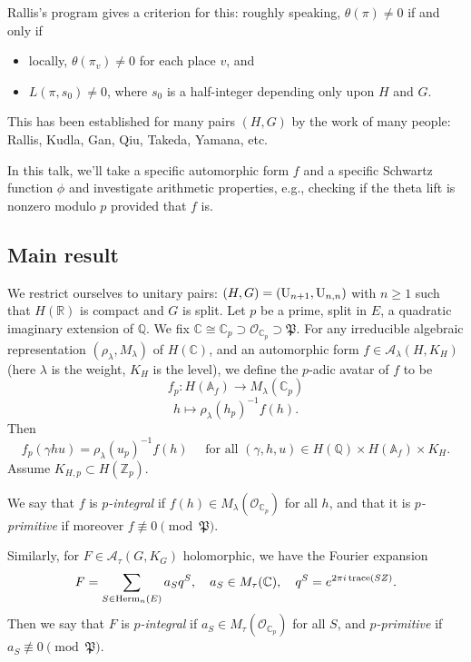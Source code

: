 \documentclass[reqno]{amsart} 
\numberwithin{theorem}{section}
\numberwithin{equation}{section}
\begin{document}
Rallis's program gives a criterion for this: roughly speaking, $\theta(\pi) \neq 0$ if and only if
\begin{itemize}
\item locally, $\theta(\pi_v) \neq 0$ for each place $v$, and
\item $L(\pi, s_0) \neq 0$, where $s_0$ is a half-integer depending only upon $H$ and $G$.
\end{itemize}
This has been established for many pairs $(H, G)$ by the work of many people: Rallis, Kudla, Gan, Qiu, Takeda, Yamana, etc.  

In this talk, we'll take a specific automorphic form $f$ and a specific Schwartz function $\phi$ and investigate arithmetic properties, e.g., checking if the theta lift is nonzero modulo $p$ provided that $f$ is.  

\subsection{Main result}

We restrict ourselves to unitary pairs: $(H, G) =(\operatorname{U}_{n + 1}, \operatorname{U}_{n, n})$ with $n \geq 1$ such that $H(\mathbb{R})$ is compact and $G$ is split.  Let $p$ be a prime, split in $E$, a quadratic imaginary extension of $\mathbb{Q}$.  We fix $\mathbb{C} \cong \mathbb{C}_p \supset \mathcal{O}_{\mathbb{C}_p} \supset \mathfrak{P}$.  For any irreducible algebraic representation $(\rho_\lambda, M_\lambda)$ of $H(\mathbb{C})$, and an automorphic form $f \in \mathcal{A}_\lambda(H, K_H)$ (here $\lambda$ is the weight, $K_H$ is the level), we define the $p$-adic avatar of $f$ to be
\begin{equation*}
  f_p : H(\mathbb{A}_f) \rightarrow M_\lambda(\mathbb{C}_p)
\end{equation*}
\begin{equation*}
  h \mapsto \rho_\lambda(h_p)^{-1} f(h).
\end{equation*}
Then
\begin{equation*}
  f_p(\gamma h u) = \rho_\lambda(u_p)^{-1} f(h)
  \quad
  \text{ for all }
  (\gamma, h, u) \in H(\mathbb{Q}) \times H(\mathbb{A}_f) \times K_H.
\end{equation*}
Assume $K_{H, p} \subset H(\mathbb{Z}_p)$.

We say that $f$ is $p$\emph{-integral} if $f(h) \in M_\lambda(\mathcal{O}_{\mathbb{C}_p})$ for all $h$, and that it is $p$\emph{-primitive} if moreover $f \not \equiv 0 \pmod{\mathfrak{P}}$.

Similarly, for $F \in \mathcal{A}_\tau(G, K_G)$ holomorphic, we have the Fourier expansion
\begin{equation*}
  F = \sum_{S \in \mathrm{Herm}_n(E)} a_S q^S, \quad
  a_S \in M_\tau(\mathbb{C}), \quad
  q^S = e^{2 \pi i \operatorname{trace}(S Z)}.
\end{equation*}
Then we say that $F$ is $p$\emph{-integral} if $a_S \in M_\tau(\mathcal{O}_{\mathbb{C}_p})$ for all $S$, and $p$\emph{-primitive} if $a_S \not \equiv 0 \pmod{\mathfrak{P}}$.
\end{document}

